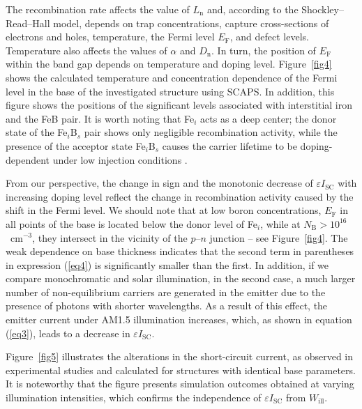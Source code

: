 \documentclass[a4paper,fleqn]{cas-sc}
\begin{document}
The recombination rate affects the value of $L_\mathrm{n}$ and, according to the Shockley–Read–Hall model, depends on trap concentrations, capture cross-sections of electrons and holes, temperature, the Fermi level $E_\mathrm{F}$, and defect levels. Temperature also affects the values of $\alpha$ and $D_\mathrm{n}$. In turn, the position of $E_\mathrm{F}$ within the band gap depends on temperature and doping level. Figure~\ref{fig4} shows the calculated temperature and concentration dependence of the Fermi level in the base of the investigated structure using SCAPS. In addition, this figure shows the positions of the significant levels associated with interstitial iron and the FeB pair. It is worth noting that Fe$_i$ acts as a deep center; the donor state of the Fe$_i$B$_s$ pair shows only negligible recombination activity, while the presence of the acceptor state Fe$_i$B$_s$ causes the carrier lifetime to be doping-dependent under low injection conditions \cite{FeB:Schmidt}.

From our perspective, the change in sign and the monotonic decrease of $\varepsilon I_\mathrm{SC}$ with increasing doping level reflect the change in recombination activity caused by the shift in the Fermi level. We should note that at low boron concentrations, $E_\mathrm{F}$ in all points of the base is located below the donor level of Fe$_i$, while at $N_\mathrm{B}>10^{16}$~cm$^{-3}$, they intersect in the vicinity of the $p$–$n$ junction – see Figure~\ref{fig4}. The weak dependence on base thickness indicates that the second term in parentheses in expression (\ref{eq4}) is significantly smaller than the first. In addition, if we compare monochromatic and solar illumination, in the second case, a much larger number of non-equilibrium carriers are generated in the emitter due to the presence of photons with shorter wavelengths. As a result of this effect, the emitter current under AM1.5 illumination increases, which, as shown in equation (\ref{eq3}), leads to a decrease in $\varepsilon I_\mathrm{SC}$.

Figure~\ref{fig5} illustrates the alterations in the short-circuit current, as observed in experimental studies and calculated for structures with identical base parameters. It is noteworthy that the figure presents simulation outcomes obtained at varying illumination intensities, which confirms the independence of $\varepsilon I_\mathrm{SC}$ from $W_\mathrm{ill}$. 
\end{document}
